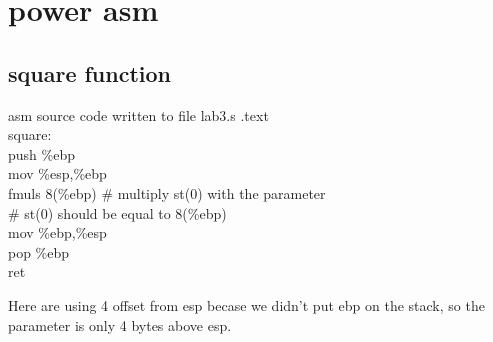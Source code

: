 \documentclass{article}
\begin{document}
\clearpage\section{power asm}
\subsection{square function}
\begin{GFT}{asm source code written to file lab3.s}
\+.text\\
\+square:\\
\+  push \%ebp \\
\+  mov \%esp,\%ebp\\
\+  fmuls 8(\%ebp)			\# multiply st(0) with the parameter\\
\+				\# st(0) should be equal to 8(\%ebp)\\
\+  mov \%ebp,\%esp\\
\+  pop \%ebp\\
\+  ret\\
\end{GFT}
Here are using 4 offset from esp becase we didn't put ebp on the stack, so the parameter is only 4 bytes above esp.
\end{document}
